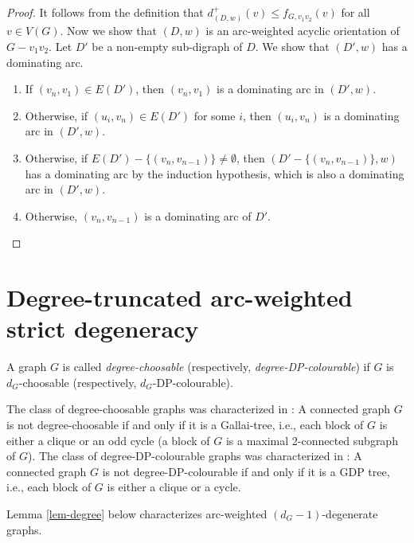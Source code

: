 \documentclass[11pt,a4paper]{article}
\theoremstyle{definition}
\begin{document}
\begin{proof}
 It follows from the definition that $d_{(D,w)}^+(v) \le f_{G, v_1v_2}(v)$ for all $v \in V(G)$.
    Now we show that $(D,w)$ is    an arc-weighted   acyclic  orientation of $G-v_1v_2$. Let $D'$ be a non-empty sub-digraph of $D$. We  show that $(D',w)$ has a dominating arc.
    \begin{enumerate}
        \item If $(v_n, v_1) \in E(D')$, then $(v_n, v_1)$ is a dominating arc in $(D',w)$. 
        \item Otherwise,  if 
    $(u_i, v_n) \in E(D')$ for some $i$, then $(u_i, v_n)$ is a dominating arc in $(D',w)$.
    \item Otherwise, if $E(D') - \{(v_n, v_{n-1})\} \ne \emptyset$, then $(D'- \{(v_n, v_{n-1})\},w)$ has a dominating arc by the induction hypothesis, which is also a dominating arc in $(D',w)$.
    \item Otherwise, $(v_n, v_{n-1})$ is a dominating arc of $D'$. \qedhere
    \end{enumerate}
\end{proof}


\section{Degree-truncated arc-weighted strict degeneracy}

A graph $G$ is called {\em degree-choosable} (respectively, {\em degree-DP-colourable}) if $G$ is $d_G$-choosable (respectively, $d_G$-DP-colourable). 

The class of degree-choosable graphs was characterized in \cite{Borodin, ERT}: A connected graph $G$ is not degree-choosable if and only if it is a Gallai-tree, i.e., each block of $G$ is either a clique or an odd cycle (a block of $G$ is a maximal 2-connected subgraph of $G$). The class of degree-DP-colourable graphs was characterized in \cite{BKP,KO19}: A connected graph $G$ is not degree-DP-colourable if and only if it is a GDP tree, i.e., each block of $G$ is either a clique or a  cycle.

 Lemma \ref{lem-degree} below characterizes arc-weighted $(d_G-1)$-degenerate graphs.
   
\end{document}
